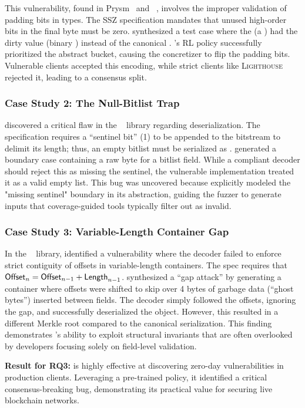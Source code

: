 This vulnerability, found in Prysm~\cite{prysm} and ~\cite{pyssz}, involves the improper validation of padding bits in  types. The SSZ specification mandates that unused high-order bits in the final byte must be zero. \tool synthesized a test case where the  (a ) had the dirty value  (binary ) instead of the canonical . \tool's RL policy successfully prioritized the  abstract bucket, causing the concretizer to flip the padding bits. Vulnerable clients accepted this encoding, while strict clients like \textsc{Lighthouse}~\cite{lighthouse} rejected it, leading to a consensus split.

\subsubsection{Case Study 2: The Null-Bitlist Trap}

\tool discovered a critical flaw in the ~\cite{dynamic_ssz} library regarding  deserialization. The specification requires a ``sentinel bit'' (1) to be appended to the bitstream to delimit its length; thus, an empty bitlist must be serialized as . \tool generated a boundary case containing a raw  byte for a bitlist field. While a compliant decoder should reject this as missing the sentinel, the vulnerable implementation treated it as a valid empty list. This bug was uncovered because \tool explicitly modeled the "missing sentinel" boundary in its abstraction, guiding the fuzzer to generate inputs that coverage-guided tools typically filter out as invalid.

\subsubsection{Case Study 3: Variable-Length Container Gap}

In the ~\cite{remerkleable} library, \tool identified a vulnerability where the decoder failed to enforce strict contiguity of offsets in variable-length containers. The spec requires that ${\sf Offset}_n = {\sf Offset}_{n-1} + {\sf Length}_{n-1}$. \tool synthesized a ``gap attack'' by generating a container where offsets were shifted to skip over 4 bytes of garbage data (``ghost bytes'') inserted between fields. The decoder simply followed the offsets, ignoring the gap, and successfully deserialized the object. However, this resulted in a different Merkle root compared to the canonical serialization. This finding demonstrates \tool's ability to exploit structural invariants that are often overlooked by developers focusing solely on field-level validation.

\begin{mdframed}[
    backgroundcolor=gray!10,
    linecolor=white,
    skipabove=0.5em
    ]\noindent
    \textbf{Result for RQ3:} \tool is highly effective at discovering zero-day vulnerabilities in production clients. Leveraging a pre-trained policy, it identified a critical consensus-breaking bug, demonstrating its practical value for securing live blockchain networks.
\end{mdframed}
